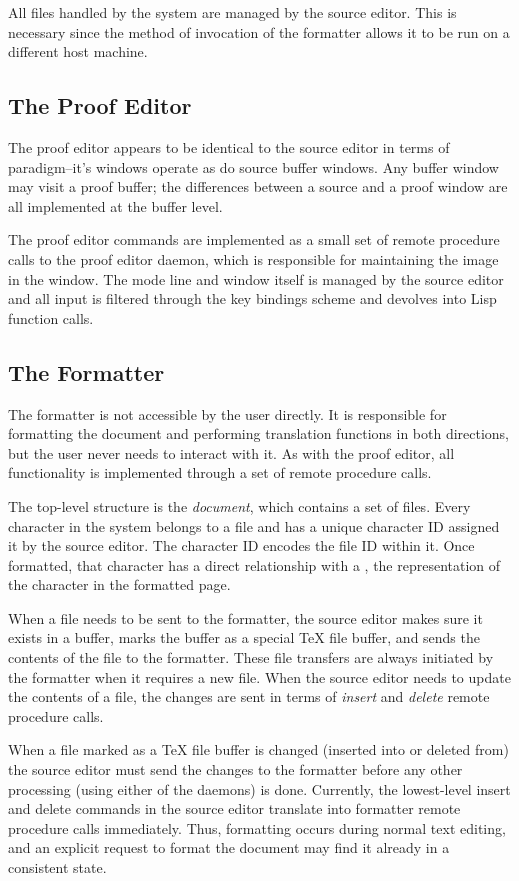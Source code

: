 All files handled by the system are managed by the source editor.
This is necessary since the method of invocation of the formatter
allows it to be run on a different host machine.

\subsection{The Proof Editor}

The proof editor appears to be identical to the source editor in terms
of paradigm--it's windows operate as do source buffer windows.  Any
{\VorTeX} buffer window may visit a proof buffer; the differences
between a source and a proof window are all implemented at the buffer
level.

The proof editor commands are implemented as a small set of remote
procedure calls to the proof editor daemon, which is responsible for
maintaining the image in the window.  The mode line and window itself
is managed by the source editor and all input is filtered through the
key bindings scheme and devolves into Lisp function calls.

\subsection{The Formatter}

The formatter is not accessible by the user directly.  It is responsible
for formatting the document and performing translation functions in
both directions, but the user never needs to interact with it.  As with
the proof editor, all functionality is implemented through a set of
remote procedure calls.

The top-level structure is the {\em document\/}, which contains a set
of {files\/}.  Every character in the system belongs to a file and has
a unique character ID assigned it by the source editor.  The character
ID encodes the file ID within it.  Once formatted, that character has
a direct relationship with a \tbox, the representation of the
character in the formatted page.

When a file needs to be sent to the formatter, the source editor makes
sure it exists in a buffer, marks the buffer as a special {\TeX} file
buffer, and sends the contents of the file to the formatter.  These
file transfers are always initiated by the formatter when it requires
a new file.  When the source editor needs to update the contents of a
file, the changes are sent in terms of {\em insert\/} and {\em delete\/}
remote procedure calls.

When a file marked as a {\TeX} file buffer is changed (inserted into
or deleted from) the source editor must send the changes to the
formatter before any other processing (using either of the daemons) is
done.  Currently, the lowest-level insert and delete commands in the
source editor translate into formatter remote procedure calls
immediately.  Thus, formatting occurs during normal text editing, and
an explicit request to format the document may find it already in a
consistent state.
